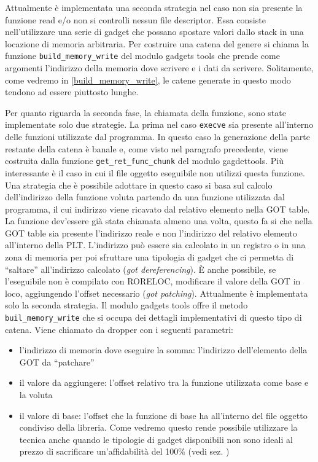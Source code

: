 Attualmente è implementata una seconda strategia nel caso non sia
presente la funzione read e/o non si controlli nessun file
descriptor. Essa consiste nell'utilizzare una serie di gadget che
possano spostare valori dallo stack in una locazione di memoria
arbitraria.  Per costruire una catena del genere si chiama la funzione
\lstinline{build_memory_write} del modulo gadgets tools che prende
come argomenti l'indirizzo della memoria dove scrivere e i dati da
scrivere. Solitamente, come vedremo in \ref{build_memory_write}, le
catene generate in questo modo tendono ad essere piuttosto lunghe.


Per quanto riguarda la seconda fase, la chiamata della funzione, sono
state implementate solo due strategie. La prima nel caso
\lstinline{execve} sia presente all'interno delle funzioni utilizzate
dal programma. In questo caso la generazione della parte restante
della catena è banale e, come visto nel paragrafo precedente, viene
costruita dalla funzione \lstinline{get_ret_func_chunk} del modulo
gagdettools. Più interessante è il caso in cui il file oggetto
eseguibile non utilizzi questa funzione. Una strategia che è possibile
adottare in questo caso si basa sul calcolo dell'indirizzo della
funzione voluta partendo da una funzione utilizzata dal programma, il
cui indirizzo viene ricavato dal relativo elemento nella GOT table. La
funzione dev'essere già stata chiamata almeno una volta, questo fa si
che nella GOT table sia presente l'indirizzo reale e non l'indirizzo
del relativo elemento all'interno della PLT. L'indirizzo può essere
sia calcolato in un registro o in una zona di memoria per poi
sfruttare una tipologia di gadget che ci permetta di ``saltare''
all'indirizzo calcolato (\emph{got dereferencing}). È anche possibile,
se l'eseguibile non è compilato con RORELOC, modificare il valore
della GOT in loco, aggiungendo l'offset necessario (\emph{got
  patching}). Attualmente è implementata solo la seconda strategia. Il
modulo gadgets tools offre il metodo \lstinline{buil_memory_write} che
si occupa dei dettagli implementativi di questo tipo di catena. Viene
chiamato da dropper con i seguenti parametri:

\begin{itemize}
  \item l'indirizzo di memoria dove eseguire la somma: l'indirizzo
    dell'elemento della GOT da ``patchare''

  \item il valore da aggiungere: l'offset relativo tra la funzione
    utilizzata come base e la voluta

  \item il valore di base: l'offset che la funzione di base ha
    all'interno del file oggetto condiviso della libreria. Come
    vedremo questo rende possibile utilizzare la tecnica anche quando
    le tipologie di gadget disponibili non sono ideali al prezzo di
    sacrificare un'affidabilità del 100\% (vedi sez. )
\end{itemize}

